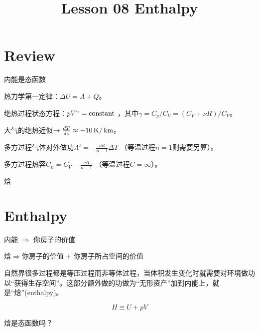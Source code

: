 \documentclass[CJK]{beamer}
\title{Lesson 08 Enthalpy}
\author{}
\date{}
\begin{document}

\section{Review}

\begin{frame}
\bch
\bitem
\item{内能是态函数}
\item{热力学第一定律：$\Delta U = A + Q$。}
\item{绝热过程状态方程：$pV^\gamma = \mathrm{constant}$ ，其中$\gamma = C_p/C_V = (C_V + \nu R)/C_V$。}
\item{大气的绝热近似$\rightarrow \frac{dT}{dz} \approx -10 \,\mathrm{K}/\,\mathrm{km}$。}
\item{多方过程气体对外做功$A' = -\frac{\nu R}{n-1}\Delta T$ （等温过程$n=1$则需要另算）。}
\item{多方过程热容$C_n =C_V -\frac{\nu R}{n-1}$ （等温过程$C = \infty$）。}
\eitem
\ech
\end{frame}

\begin{frame}
\bch
\bitem
\item{\Large 焓}
\eitem
\ech
\end{frame}

\section{Enthalpy}



\begin{frame}
\bch

内能 $\Rightarrow$ 你房子的价值

焓$\Rightarrow$你房子的价值 + 你房子所占空间的价值

\skipline

自然界很多过程都是等压过程而非等体过程，当体积发生变化时就需要对环境做功以“获得生存空间”。这部分额外做的功做为“无形资产”加到内能上，就是“焓”(enthalpy)。

$$ H \equiv U + pV$$


\ech
\end{frame}

\begin{frame}
\bch
{}
焓是态函数吗？
\ech
\end{frame}


\begin{frame}
\chtitle{}
\bch
\ech
\end{frame}

\begin{frame}
\chtitle{}
\bch
\ech
\end{frame}
\end{document}

